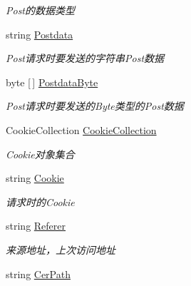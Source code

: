 \begin{DoxyCompactItemize}
\begin{DoxyCompactList}\small\item\em Post的数据类型 \end{DoxyCompactList}\item 
string \hyperlink{class_x_c_l_net_tools_1_1_entity_1_1_http_1_1_http_item_a9151cc1e4067ca0b035052ee0a8b3de9}{Postdata}
\begin{DoxyCompactList}\small\item\em Post请求时要发送的字符串\+Post数据 \end{DoxyCompactList}\item 
byte \mbox{[}$\,$\mbox{]} \hyperlink{class_x_c_l_net_tools_1_1_entity_1_1_http_1_1_http_item_a49b2ba8771878dab0de105397ebc69de}{Postdata\+Byte}
\begin{DoxyCompactList}\small\item\em Post请求时要发送的\+Byte类型的\+Post数据 \end{DoxyCompactList}\item 
Cookie\+Collection \hyperlink{class_x_c_l_net_tools_1_1_entity_1_1_http_1_1_http_item_a6130bb5eec4b2b63c195ee5ae2c9bbfd}{Cookie\+Collection}
\begin{DoxyCompactList}\small\item\em Cookie对象集合 \end{DoxyCompactList}\item 
string \hyperlink{class_x_c_l_net_tools_1_1_entity_1_1_http_1_1_http_item_ad77662f721b534aa063629e91e98cdbc}{Cookie}
\begin{DoxyCompactList}\small\item\em 请求时的\+Cookie \end{DoxyCompactList}\item 
string \hyperlink{class_x_c_l_net_tools_1_1_entity_1_1_http_1_1_http_item_a8fa227e3f6f7f0a925eb6cf2f1011ec3}{Referer}
\begin{DoxyCompactList}\small\item\em 来源地址，上次访问地址 \end{DoxyCompactList}\item 
string \hyperlink{class_x_c_l_net_tools_1_1_entity_1_1_http_1_1_http_item_a21142bbbdda03289d1ee38410dbe6fda}{Cer\+Path}

\end{DoxyCompactItemize}
